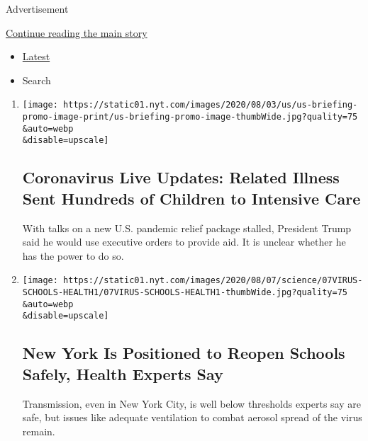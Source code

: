 Advertisement

\protect\hyperlink{after-mid1}{Continue reading the main story}

\begin{itemize}
\tightlist
\item
  \protect\hyperlink{stream-panel}{Latest}
\item
  Search
\end{itemize}

\begin{enumerate}
\def\labelenumi{\arabic{enumi}.}
\item
  \href{/2020/08/08/world/coronavirus-updates.html}{}

  \texttt{[image: https://static01.nyt.com/images/2020/08/03/us/us-briefing-promo-image-print/us-briefing-promo-image-thumbWide.jpg?quality=75\\\&auto=webp\\\&disable=upscale]}

  \hypertarget{coronavirus-live-updates-related-illness-sent-hundreds-of-children-to-intensive-care}{%
  \subsection{Coronavirus Live Updates: Related Illness Sent Hundreds of
  Children to Intensive
  Care}\label{coronavirus-live-updates-related-illness-sent-hundreds-of-children-to-intensive-care}}

  With talks on a new U.S. pandemic relief package stalled, President
  Trump said he would use executive orders to provide aid. It is unclear
  whether he has the power to do so.
\item
  \href{/2020/08/07/health/coronavirus-ny-schools-reopen.html}{}

  \texttt{[image: https://static01.nyt.com/images/2020/08/07/science/07VIRUS-SCHOOLS-HEALTH1/07VIRUS-SCHOOLS-HEALTH1-thumbWide.jpg?quality=75\\\&auto=webp\\\&disable=upscale]}

  \hypertarget{new-york-is-positioned-to-reopen-schools-safely-health-experts-say}{%
  \subsection{New York Is Positioned to Reopen Schools Safely, Health
  Experts
  Say}\label{new-york-is-positioned-to-reopen-schools-safely-health-experts-say}}

  Transmission, even in New York City, is well below thresholds experts
  say are safe, but issues like adequate ventilation to combat aerosol
  spread of the virus remain.


\end{enumerate}
